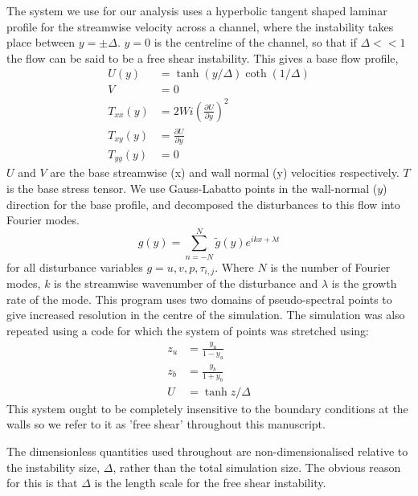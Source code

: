 \documentclass{jfm}
\newcommand{\dy}[1]{\frac{\partial #1}{\partial y}}
\begin{document}
The system we use for our analysis uses a hyperbolic tangent shaped laminar
profile for the streamwise velocity across a channel, where the instability
takes place between $y = \pm \Delta$. $y=0$ is the centreline of the channel,
so that if $\Delta << 1$ the flow can be said to be a free shear instability.
This gives a base flow profile, 
\begin{align} 
    U(y) &= \tanh \left( y/\Delta
    \right) \coth \left( 1/\Delta \right) \nonumber\\ V &= 0 \nonumber \\
    T_{xx}(y) &= 2 Wi \left( \dy{U} \right)^{2} \nonumber \\ T_{xy}(y) &=
    \dy{U} \nonumber \\ T_{yy}(y) &= 0 \nonumber \label{eq:KH_laminar_profile}
\end{align}
$U$ and $V$ are the base streamwise (x) and wall normal (y) velocities
respectively. $T$ is the base stress tensor. We use Gauss-Labatto points in the
wall-normal ($y$) direction for the base profile, and decomposed the
disturbances to this flow into Fourier modes.  
\begin{equation} 
    g(y) = \sum\limits_{n=-N}^{N} \widetilde{g}(y) e^{ikx + \lambda t} 
\end{equation}
for all disturbance variables $g = u, v, p, \tau_{i,j}$. Where $N$ is the
number of Fourier modes, $k$ is the streamwise wavenumber of the disturbance
and $\lambda$ is the growth rate of the mode. This program uses two domains of
pseudo-spectral points to give increased resolution in the centre of the
simulation. The simulation was also repeated using a code for which the system
of points was stretched using: 
\begin{align} 
    z_{u} &= \frac{y_{u}}{1-y_{u}} \\
    z_{b} &= \frac{y_{b}}{1+y_{b}} \\ U     &= \tanh{z/\Delta}
    \label{eq:KH_inf_profile} 
\end{align} 
This system ought to be completely insensitive to the boundary conditions at
the walls so we refer to it as 'free shear' throughout this manuscript. 

The dimensionless quantities used throughout are non-dimensionalised relative
to the instability size, $\Delta$, rather than the total simulation size. The
obvious reason for this is that $\Delta$ is the length scale for the free shear
instability.
\end{document}
